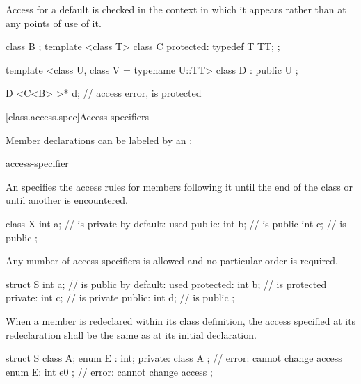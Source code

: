 \pnum
Access for a default 
is checked in the context in which it appears rather than at any
points of use of it.
\begin{example}
\begin{codeblock}
class B { };
template <class T> class C {
protected:
  typedef T TT;
};

template <class U, class V = typename U::TT>
class D : public U { };

D <C<B> >* d;       // access error,  is protected
\end{codeblock}
\end{example}

[class.access.spec]{Access specifiers}%

\pnum
Member declarations can be labeled by an
:

\begin{ncsimplebnf}
access-specifier \terminal{:} 
\end{ncsimplebnf}

An
specifies the access rules for members following it
until the end of the class or until another
is encountered.
\begin{example}
\begin{codeblock}
class X {
  int a;            //  is private by default:  used
public:
  int b;            //  is public
  int c;            //  is public
};
\end{codeblock}
\end{example}

\pnum
Any number of access specifiers is allowed and no particular order is required.
\begin{example}
\begin{codeblock}
struct S {
  int a;            //  is public by default:  used
protected:
  int b;            //  is protected
private:
  int c;            //  is private
public:
  int d;            //  is public
};
\end{codeblock}
\end{example}

\pnum
When a member is redeclared within its class definition,
the access specified at its redeclaration shall
be the same as at its initial declaration.
\begin{example}
\begin{codeblock}
struct S {
  class A;
  enum E : int;
private:
  class A { };                  // error: cannot change access
  enum E: int { e0 };           // error: cannot change access
};
\end{codeblock}
\end{example}

